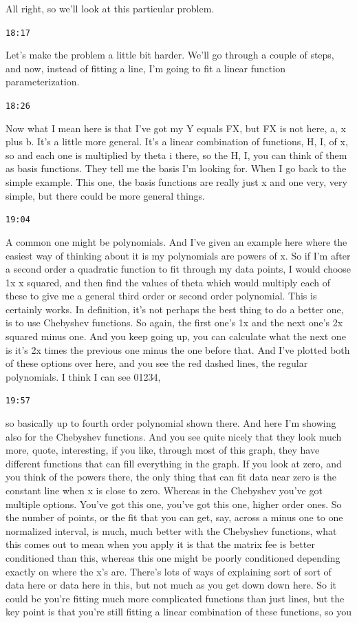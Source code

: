 \documentclass[11pt,a4paper]{article}
\newcommand{\timestamp}[1]{%
  \par\vspace{0.35em}%
  \noindent\colorbox{timestampback}{\textcolor{timestampblue}{\small\texttt{#1}}}%
  \par\vspace{0.2em}%
}
\begin{document}
All right, so we'll look at this particular problem.



\timestamp{18:17}

Let's make the problem a little bit harder. We'll go through a couple of steps, and now, instead of fitting a line, I'm going to fit a linear function parameterization.



\timestamp{18:26}

Now what I mean here is that I've got my Y equals FX, but FX is not here, a, x plus b. It's a little more general. It's a linear combination of functions, H, I, of x, so and each one is multiplied by theta i there, so the H, I, you can think of them as basis functions. They tell me the basis I'm looking for. When I go back to the simple example. This one, the basis functions are really just x and one very, very simple, but there could be more general things.



\timestamp{19:04}

A common one might be polynomials. And I've given an example here where the easiest way of thinking about it is my polynomials are powers of x. So if I'm after a second order a quadratic function to fit through my data points, I would choose 1x x squared, and then find the values of theta which would multiply each of these to give me a general third order or second order polynomial. This is certainly works. In definition, it's not perhaps the best thing to do a better one, is to use Chebyshev functions. So again, the first one's 1x and the next one's 2x squared minus one. And you keep going up, you can calculate what the next one is it's 2x times the previous one minus the one before that. And I've plotted both of these options over here, and you see the red dashed lines, the regular polynomials. I think I can see 01234,



\timestamp{19:57}

so basically up to fourth order polynomial shown there. And here I'm showing also for the Chebyshev functions. And you see quite nicely that they look much more, quote, interesting, if you like, through most of this graph, they have different functions that can fill everything in the graph. If you look at zero, and you think of the powers there, the only thing that can fit data near zero is the constant line when x is close to zero. Whereas in the Chebyshev you've got multiple options. You've got this one, you've got this one, higher order ones. So the number of points, or the fit that you can get, say, across a minus one to one normalized interval, is much, much better with the Chebyshev functions, what this comes out to mean when you apply it is that the matrix fee is better conditioned than this, whereas this one might be poorly conditioned depending exactly on where the x's are. There's lots of ways of explaining sort of sort of data here or data here in this, but not much as you get down down here. So it could be you're fitting much more complicated functions than just lines, but the key point is that you're still fitting a linear combination of these functions, so you
\end{document}
